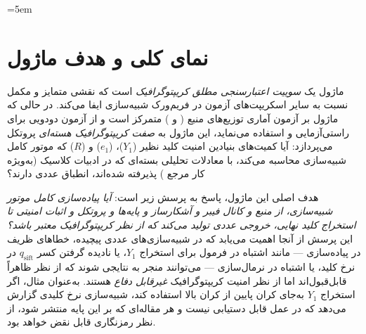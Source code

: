 \sloppy
\emergencystretch=5em



\section{نمای کلی و هدف ماژول}

ماژول  یک \emph{سوییت اعتبارسنجی مطلق کریپتوگرافیک} است که نقشی متمایز و مکمل نسبت به سایر اسکریپت‌های آزمون در فریم‌ورک شبیه‌سازی  ایفا می‌کند. در حالی که ماژول  بر آزمون آماری توزیع‌های منبع ( و ) متمرکز است و از آزمون  دودویی برای راستی‌آزمایی  و  استفاده می‌نماید، این ماژول به \emph{صفت کریپتوگرافیک هسته‌ای} پروتکل می‌پردازد: آیا کمیت‌های بنیادین امنیت کلید نظیر  ($Y_1$)،  ($e_1$) و  ($R$) که موتور کامل شبیه‌سازی محاسبه می‌کند، با معادلات تحلیلی بسته‌ای که در ادبیات کلاسیک  (به‌ویژه کار مرجع ) پذیرفته شده‌اند، انطباق عددی دارند؟

هدف اصلی این ماژول، پاسخ به پرسش زیر است: \emph{آیا پیاده‌سازی کامل موتور شبیه‌سازی، از منبع  و کانال فیبر و آشکارساز  و  پایه‌ها و پروتکل  و اثبات امنیتی  تا استخراج کلید نهایی، خروجی عددی تولید می‌کند که از نظر کریپتوگرافیک معتبر باشد؟} این پرسش از آنجا اهمیت می‌یابد که در شبیه‌سازی‌های عددی پیچیده، خطاهای ظریف در پیاده‌سازی — مانند اشتباه در فرمول  برای استخراج $Y_1$، یا نادیده گرفتن کسر  $q_{\text{sift}}$ در نرخ کلید، یا اشتباه در نرمال‌سازی  — می‌توانند منجر به نتایجی شوند که از نظر  ظاهراً قابل‌قبول‌اند اما از نظر امنیت کریپتوگرافیک \emph{غیرقابل دفاع} هستند. به‌عنوان مثال، اگر استخراج $Y_1$ به‌جای کران پایین  از کران بالا استفاده کند، شبیه‌سازی نرخ کلیدی گزارش می‌دهد که در عمل قابل دستیابی نیست و هر مقاله‌ای که بر این پایه منتشر شود، از نظر رمزنگاری قابل نقض خواهد بود.

